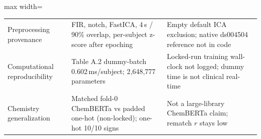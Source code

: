 \begin{table}[!t]
\begin{adjustbox}{max width=\textwidth}
\begin{tabular}{@{}p{}p{}p{}@{}}
Preprocessing provenance & FIR, notch, FastICA, 4\,s / 90\% overlap, per-subject z-score after epoching & Empty default ICA exclusion; native ds004504 reference not in code \\
Computational reproducibility & Table A.2 dummy-batch 0.602\,ms/subject; 2{,}648{,}777 parameters & Locked-run training wall-clock not logged; dummy time is not clinical real-time \\
Chemistry generalization & Matched fold-0 ChemBERTa vs padded one-hot (non-locked); one-hot 10/10 signs & Not a large-library ChemBERTa claim; rematch \(r\) stays low \\
\bottomrule
\end{tabular}
\end{adjustbox}
\end{table}
